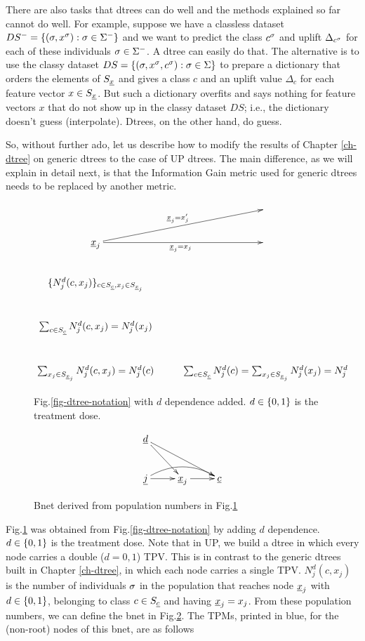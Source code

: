 There are also tasks 
that dtrees 
can do well
and the methods
explained so far
cannot do well.
For example,
suppose we have 
a classless
dataset $DS^-=\{(\sigma, x^\sigma):\sigma\in \Sigma^-\}$
and we want to predict
the class $c^\sigma$ and
uplift $\Delta_{c^\sigma}$
for each of these individuals 
$\sigma\in \Sigma^-$.
A dtree can easily
do that. The alternative
is to use the classy dataset 
$DS=\{(\sigma, x^\sigma, c^\sigma):\sigma\in \Sigma\}$
to
prepare a dictionary
that orders
the elements
of $S_{\underline{x}}$ and gives a
class $c$ and an uplift value
$\Delta_c$ for each
feature vector $x\in S_{\underline{x}}$.
But
such a dictionary overfits
and says nothing for 
feature vectors $x$
that do not show up in 
the classy dataset $DS$; i.e., the
dictionary 
doesn't guess (interpolate). Dtrees,
on the other hand, do
guess.

So, without further ado,
let us describe how to
modify the results
of Chapter \ref{ch-dtree}
on generic dtrees
to the case of UP dtrees.
The main difference,
as we will
explain in detail
next,
is that the Information
Gain metric
used for generic dtrees
needs to be replaced
by another metric.






\begin{figure}[h!]
$$
\xymatrix{
&
\\
\rvx_j\ar[r]_{\rvx_j=x_j}
\ar[ru]^{\rvx_j=x_j'}&
\\
\{N^d_j(c,x_j)\}_{c\in S_\rvc, x_j\in S_{\rvx_j}}
\\
\sum_{c\in S_\rvc}N^d_j(c,x_j)=N^d_j(x_j)
\\
\sum_{x_j\in S_{\rvx_j}}N^d_j(c,x_j)=N^d_j(c)
&
\sum_{c\in S_\rvc}N^d_j(c)=
\sum_{x_j\in S_{\rvx_j}}N^d_j(x_j)=N^d_j
}
$$
\caption{Fig.\ref{fig-dtree-notation}
 with $d$ dependence added.
$d\in \{0,1\}$
is the treatment dose.
} 
\label{fig-dtree-notation-uplift}
\end{figure}

\begin{figure}
$$
\xymatrix{
\rvd\ar[dr]\ar[drr]
\\
\rvj
\ar[r]\ar@/^1pc/[rr]
&
\rvx_j\ar[r]
&
\rvc
}$$
\caption{Bnet derived from population
numbers in Fig.\ref{fig-dtree-notation-uplift}}
\label{fig-class-bnet-uplift}
\end{figure}



Fig.\ref{fig-dtree-notation-uplift}
was obtained from Fig.\ref{fig-dtree-notation}
by adding $d$ dependence.
$d\in \{0,1\}$
is the treatment dose.
Note that in UP, we build a dtree
in which every node carries a double ($d=0,1$)
TPV. This
is in contrast to the generic dtrees built
in Chapter \ref{ch-dtree}, in which 
each node carries a single TPV.
$N^d_j(c, x_j)$ is 
the number
of individuals $\sigma$
in the population that reaches node ${\underline{x}}_j$
with $d\in \{0,1\}$, belonging
to class $c\in S_{\underline{c}}$ and having ${\underline{x}}_j=x_j$. 
From these population numbers, we can define
the bnet in Fig.\ref{fig-class-bnet-uplift}.
The TPMs, printed in blue,
for the (non-root) nodes of this bnet, are as follows



